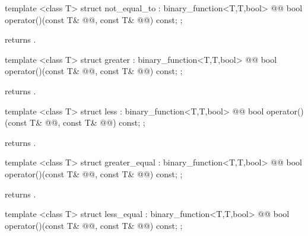 \documentclass[american,twoside]{book}
\begin{document}
%
\begin{itemdecl}
template <class T> struct not_equal_to : binary_function<T,T,bool> {
  @@
    bool operator()(const T& @@, const T& @@) const;
};
\end{itemdecl}

\begin{itemdescr}
\pnum
{} returns .
\end{itemdescr}

%
\begin{itemdecl}
template <class T> struct greater : binary_function<T,T,bool> {
  @@
    bool operator()(const T& @@, const T& @@) const;
};
\end{itemdecl}

\begin{itemdescr}
\pnum
{} returns .
\end{itemdescr}

%
\begin{itemdecl}
template <class T> struct less : binary_function<T,T,bool> {
  @@
    bool operator()(const T& @@, const T& @@) const;
};
\end{itemdecl}

\begin{itemdescr}
\pnum
{} returns .
\end{itemdescr}

%
\begin{itemdecl}
template <class T> struct greater_equal : binary_function<T,T,bool> {
  @@
    bool operator()(const T& @@, const T& @@) const;
};
\end{itemdecl}

\begin{itemdescr}
\pnum
{} returns .
\end{itemdescr}

%
\begin{itemdecl}
template <class T> struct less_equal : binary_function<T,T,bool> {
  @@
    bool operator()(const T& @@, const T& @@) const;
};
\end{itemdecl}
\end{document}
